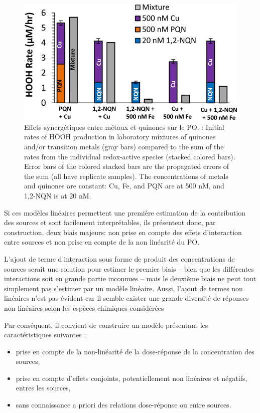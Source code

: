 \begin{figure}[ht]
    \centering
    \includegraphics[width=0.5\linewidth]{figures/chapter05/charrier_hydrogen_2014_fig4.jpg}
    \caption[Effets synergétiques entre métaux et quinones sur le PO]{Effets
        synergétiques entre métaux et quinones sur le PO. \cite[figure 4]{charrierHydrogen2014}: Initial rates of HOOH production in
    laboratory mixtures of quinones and/or transition metals (gray bars) compared to the
    sum of the rates from the individual redox-active species (stacked colored bars). Error
    bars of the colored stacked bars are the propagated errors of the sum (all have replicate
    samples). The concentrations of metals and quinones are constant: Cu, Fe, and PQN are at
    500 nM, and 1,2-NQN is at 20 nM.}%
    \label{fig:charrier_hydrogen_2014_fig4}
\end{figure}

Si ces modèles linéaires permettent une première estimation de la contribution des sources et sont
facilement interprétables, ils présentent donc, par construction, deux biais majeurs: non
prise en compte des effets d'interaction entre sources et non prise en compte de la non
linéarité du PO.

L'ajout de terme d'interaction sous forme de produit des concentrations de sources serait
une solution pour estimer le premier biais -- bien que les différentes interactions soit en grande partie inconnues --
mais le deuxième biais ne peut tout simplement
pas s'estimer par un modèle linéaire. Aussi, l'ajout de termes non linéaires n'est pas
évident car il semble exister une grande diversité de réponses non linéaires selon les
espèces chimiques
considérées~\autocite{charrierDithiothreitol2012,charrierBias2016,calasImportance2017}

Par conséquent, il convient de construire un modèle présentant les caractéristiques
suivantes :
\begin{itemize}
    \item prise en compte de la non-linéarité de la dose-réponse de la concentration des
        sources,
    \item prise en compte d'effets conjoints, potentiellement non linéaires et négatifs,
        entres les sources,
    \item sans connaissance a priori des relations dose-réponse ou entre sources.
\end{itemize}

